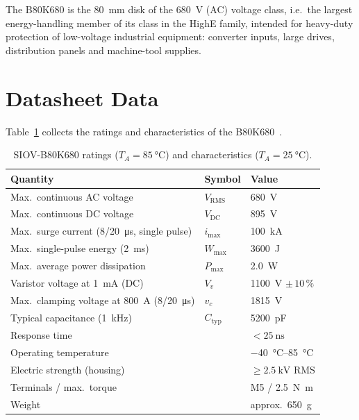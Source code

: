 \documentclass[11pt,a4paper]{article}
\begin{document}
The B80K680 is the \SI{80}{\milli\meter} disk of the \SI{680}{\volt} (AC)
voltage class, i.e.\ the largest energy-handling member of its class in the
HighE family, intended for heavy-duty protection of low-voltage industrial
equipment: converter inputs, large drives, distribution panels and
machine-tool supplies.

\section{Datasheet Data}

Table~\ref{tab:data} collects the ratings and characteristics of the
B80K680~\cite{epcos2002}.

\begin{table}[htb]
\centering
\caption{SIOV-B80K680 ratings ($T_A = \SI{85}{\celsius}$) and
characteristics ($T_A = \SI{25}{\celsius}$).}
\label{tab:data}
\begin{tabular}{lll}
\toprule
Quantity & Symbol & Value \\
\midrule
Max.\ continuous AC voltage & $V_\mathrm{RMS}$ & \SI{680}{\volt} \\
Max.\ continuous DC voltage & $V_\mathrm{DC}$ & \SI{895}{\volt} \\
Max.\ surge current (8/20~\si{\micro\second}, single pulse) & $i_\mathrm{max}$ & \SI{100}{\kilo\ampere} \\
Max.\ single-pulse energy (\SI{2}{\milli\second}) & $W_\mathrm{max}$ & \SI{3600}{\joule} \\
Max.\ average power dissipation & $P_\mathrm{max}$ & \SI{2.0}{\watt} \\
Varistor voltage at \SI{1}{\milli\ampere} (DC) & $V_v$ & \SI{1100}{\volt} $\pm\,10\,\%$ \\
Max.\ clamping voltage at \SI{800}{\ampere} (8/20~\si{\micro\second}) & $v_c$ & \SI{1815}{\volt} \\
Typical capacitance (\SI{1}{\kilo\hertz}) & $C_\mathrm{typ}$ & \SI{5200}{\pico\farad} \\
Response time & & $< \SI{25}{\nano\second}$ \\
Operating temperature & & \SIrange{-40}{85}{\celsius} \\
Electric strength (housing) & & $\geq \SI{2.5}{\kilo\volt}$ RMS \\
Terminals / max.\ torque & & M5 / \SI{2.5}{\newton\meter} \\
Weight & & approx.\ \SI{650}{\gram} \\
\bottomrule
\end{tabular}
\end{table}
\end{document}
